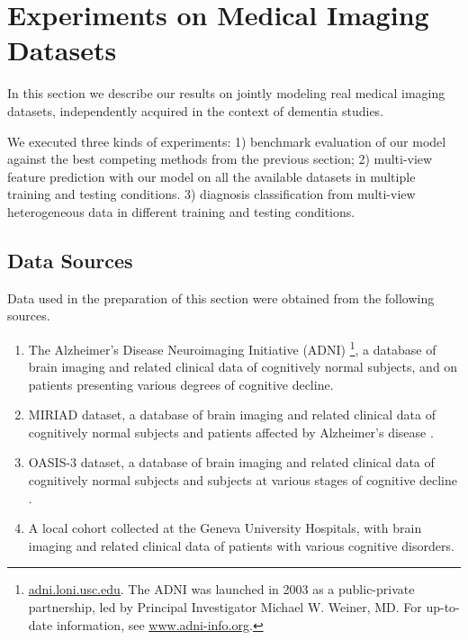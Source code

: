 \section{Experiments on Medical Imaging Datasets}
\label{sec:real}

% 
% 
% 

% 
In this section we describe our results on jointly modeling real medical imaging datasets, independently acquired in the context of dementia studies.

We executed three kinds of experiments:
1) benchmark evaluation of our model against the best competing methods from the previous section;
2) multi-view feature prediction with our model on all the available datasets in multiple training and testing conditions.
3) diagnosis classification from multi-view heterogeneous data in different training and testing conditions.

\subsection{Data Sources}
\label{ssec:datasets}

Data used in the preparation of this section were obtained from the following sources.
\begin{enumerate}
%
\item The Alzheimer's Disease Neuroimaging Initiative (ADNI)
\footnote{
\href{http://adni.loni.usc.edu}{adni.loni.usc.edu}.
The ADNI was launched in 2003 as a public-private partnership, led by Principal Investigator Michael W. Weiner, MD. For up-to-date information, see \href{www.adni-info.org}{www.adni-info.org}.
},
a database of brain imaging and related clinical data of cognitively normal subjects, and on patients presenting various degrees of cognitive decline.
%
\item MIRIAD dataset, a database of brain imaging and related clinical data of cognitively normal subjects and patients affected by Alzheimer's disease \citep{Miriad}.
%
\item OASIS-3 dataset, a database of brain imaging and related clinical data of cognitively normal subjects and subjects at various stages of cognitive decline \citep{oasis3}.
%
\item A local cohort collected at the Geneva University Hospitals, with brain imaging and related clinical data of patients with various cognitive disorders.
\end{enumerate}

